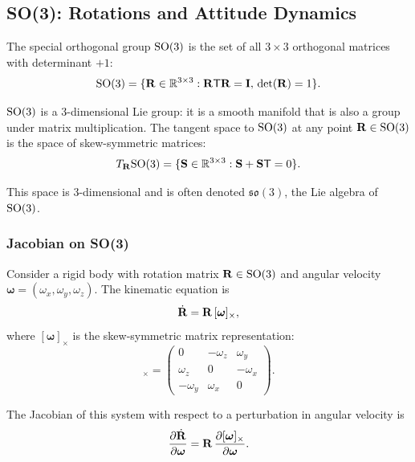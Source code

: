 \subsection{SO(3): Rotations and Attitude Dynamics}

The special orthogonal group $\mathrm{SO}(3)$ is the set of all $3 \times 3$ orthogonal matrices
with determinant $+1$:
\begin{equation}
\mathrm{SO}(3) = \{\mathbf{R} \in \mathbb{R}^{3 \times 3} : \mathbf{R}\mathsf{T} \mathbf{R} = \mathbf{I}, \, \det(\mathbf{R}) = 1\}.
\label{eq:ch1:SO3-def}
\end{equation}

$\mathrm{SO}(3)$ is a 3-dimensional Lie group: it is a smooth manifold that is also a group under
matrix multiplication. The tangent space to $\mathrm{SO}(3)$ at any point $\mathbf{R} \in \mathrm{SO}(3)$ is
the space of skew-symmetric matrices:
\begin{equation}
T_{\mathbf{R}}\mathrm{SO}(3) = \{\mathbf{S} \in \mathbb{R}^{3 \times 3} : \mathbf{S} + \mathbf{S}\mathsf{T} = 0\}.
\label{eq:ch1:so3-tangent}
\end{equation}

This space is 3-dimensional and is often denoted $\mathfrak{so}(3)$, the Lie algebra of $\mathrm{SO}(3)$.

\subsubsection{Jacobian on SO(3)}

Consider a rigid body with rotation matrix $\mathbf{R} \in \mathrm{SO}(3)$ and angular velocity
$\boldsymbol{\omega} = (\omega_x, \omega_y, \omega_z)$. The kinematic equation is
\begin{equation}
\dot{\mathbf{R}} = \mathbf{R} \, [\boldsymbol{\omega}]_{\times},
\label{eq:ch1:attitude-kinematics}
\end{equation}
where $[\boldsymbol{\omega}]_{\times}$ is the skew-symmetric matrix representation:
\begin{equation}
[\boldsymbol{\omega}]_{\times} = \begin{pmatrix} 0 & -\omega_z & \omega_y \\ \omega_z & 0 & -\omega_x \\ -\omega_y & \omega_x & 0 \end{pmatrix}.
\label{eq:ch1:skew-symmetric}
\end{equation}

The Jacobian of this system with respect to a perturbation in angular velocity is
\begin{equation}
\frac{\partial \dot{\mathbf{R}}}{\partial \boldsymbol{\omega}} = \mathbf{R} \, \frac{\partial [\boldsymbol{\omega}]_{\times}}{\partial \boldsymbol{\omega}}.
\label{eq:ch1:attitude-jacobian}
\end{equation}


